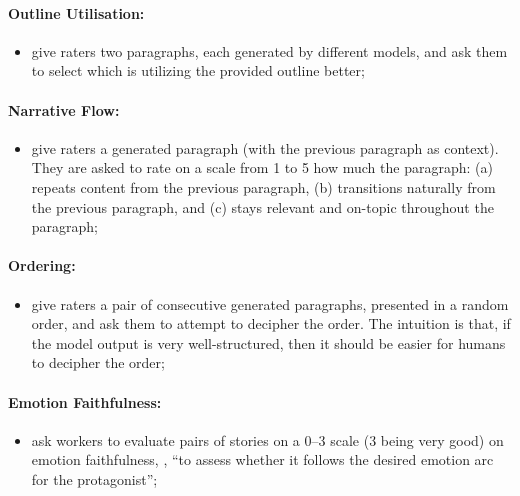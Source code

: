 \paragraph{Outline Utilisation:}
\begin{itemize}[nolistsep]
    \item \citet{rashkin-etal-2020-plotmachines} give raters two paragraphs, each generated by different models, and ask them to select which is utilizing the provided outline better;
\end{itemize}

\paragraph{Narrative Flow:}
\begin{itemize}[nolistsep]
    \item \citet{rashkin-etal-2020-plotmachines} give raters a generated paragraph (with the previous paragraph as context). They are asked to rate on a scale from 1 to 5 how much the paragraph: (a) repeats content from the previous paragraph, (b) transitions naturally from the previous paragraph, and (c) stays relevant and on-topic throughout the paragraph;
\end{itemize}

\paragraph{Ordering:}
\begin{itemize}[nolistsep]
    \item \citet{rashkin-etal-2020-plotmachines} give raters a pair of consecutive generated paragraphs, presented in a random order, and ask them to attempt to decipher the order. The intuition is that, if the model output is very well-structured, then it should be easier for humans to decipher the order;
\end{itemize}

\paragraph{Emotion Faithfulness:}
\begin{itemize}[nolistsep]
    \item \citet{brahman2020modeling} ask workers to evaluate pairs of stories on a 0--3 scale (3 being very good) on emotion faithfulness, \ie, ``to assess whether it follows the desired emotion arc for the protagonist'';
\end{itemize}

